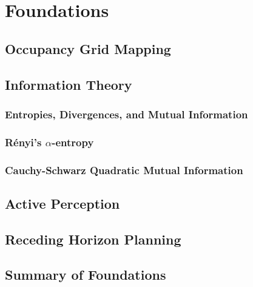 \chapter{Foundations}

\section{Occupancy Grid Mapping}

\section{Information Theory}
\subsection{Entropies, Divergences, and Mutual Information}
\subsection{R\'{e}nyi's $\alpha$-entropy}
\subsection{Cauchy-Schwarz Quadratic Mutual Information}

\section{Active Perception}

\section{Receding Horizon Planning}

\section{Summary of Foundations}
